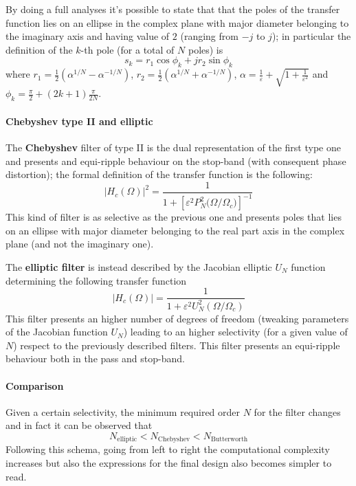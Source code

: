 	By doing a full analyses it's possible to state that that the poles of the transfer function lies on an ellipse in the complex plane with major diameter belonging to the imaginary axis and having value of $2$ (ranging from $-j$ to $j$); in particular the definition of the $k$-th pole (for a total of $N$ poles) is
	\[ s_k = r_1 \cos\phi_k + jr_2 \sin\phi_k  \]
	where $r_1 = \frac 1 2 \left( \alpha^{1/N} - \alpha^{-1/N} \right)$, $r_2 = \frac 1 2 \left( \alpha^{1/N} + \alpha^{-1/N} \right)$,  $\alpha = \frac 1 \varepsilon + \sqrt{1 + \frac 1 {\varepsilon^2}}$ and $\phi_k = \frac \pi 2 + (2k+1)\frac{\pi}{2N}$.
	
	\paragraph{Chebyshev type II and elliptic} The \textbf{Chebyshev} filter of type II is the dual representation of the first type one and presents and equi-ripple behaviour on the stop-band (with consequent phase distortion); the formal definition of the transfer function is the following:
	\begin{equation}
		\big|H_c(\Omega)\big|^2 = \frac 1 { 1 + \left[ \varepsilon^ 2 P_N^2 \big(\Omega/\Omega_c\big) \right]^{-1} }
	\end{equation}	
	This kind of filter is as selective as the previous one and presents poles that lies on an ellipse with major diameter belonging to the real part axis in the complex plane (and not the imaginary one).
	
	The \textbf{elliptic filter} is instead described by the Jacobian elliptic $U_N$ function determining the following transfer function
	\begin{equation}
		\big|H_c(\Omega)\big| = \frac{1}{1 + \varepsilon^2 U_N^2(\Omega/\Omega_c) }
	\end{equation}
	This filter presents an higher number of degrees of freedom (tweaking parameters of the Jacobian function $U_N$) leading to an higher selectivity (for a given value of $N$) respect to the previously described filters. This filter presents an equi-ripple behaviour both in the pass and stop-band.
	
	\paragraph{Comparison} Given a certain selectivity, the minimum required order $N$ for the filter changes and in fact it can be observed that
	\[ N_\textrm{elliptic} < N_\textrm{Chebyshev} < N_\textrm{Butterworth} \]
	Following this schema, going from left to right the computational complexity increases but also the expressions for the final design also becomes simpler to read.
	
